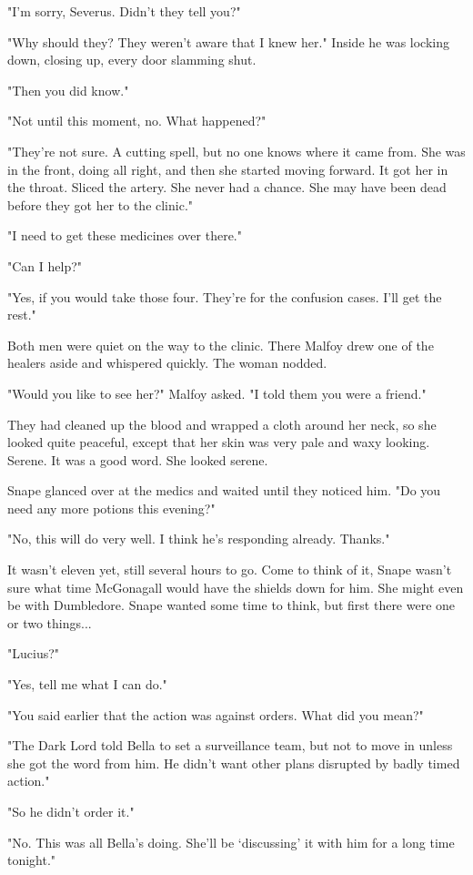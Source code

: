 \documentclass[a4paper,11pt]{article}
\begin{document}
"I'm sorry, Severus. Didn't they tell you?"

"Why should they? They weren't aware that I knew her." Inside he was locking down, closing up, every door slamming shut.

"Then you did know."

"Not until this moment, no. What happened?"

"They're not sure. A cutting spell, but no one knows where it came from. She was in the front, doing all right, and then she started moving forward. It got her in the throat. Sliced the artery. She never had a chance. She may have been dead before they got her to the clinic."

"I need to get these medicines over there."

"Can I help?"

"Yes, if you would take those four. They're for the confusion cases. I'll get the rest."

Both men were quiet on the way to the clinic. There Malfoy drew one of the healers aside and whispered quickly. The woman nodded.

"Would you like to see her?" Malfoy asked. "I told them you were a friend."

They had cleaned up the blood and wrapped a cloth around her neck, so she looked quite peaceful, except that her skin was very pale and waxy looking. Serene. It was a good word. She looked serene.

Snape glanced over at the medics and waited until they noticed him. "Do you need any more potions this evening?"

"No, this will do very well. I think he's responding already. Thanks."

It wasn't eleven yet, still several hours to go. Come to think of it, Snape wasn't sure what time McGonagall would have the shields down for him. She might even be with Dumbledore. Snape wanted some time to think, but first there were one or two things...

"Lucius?"

"Yes, tell me what I can do."

"You said earlier that the action was against orders. What did you mean?"

"The Dark Lord told Bella to set a surveillance team, but not to move in unless she got the word from him. He didn't want other plans disrupted by badly timed action."

"So he didn't order it."

"No. This was all Bella's doing. She'll be `discussing' it with him for a long time tonight."
\end{document}
